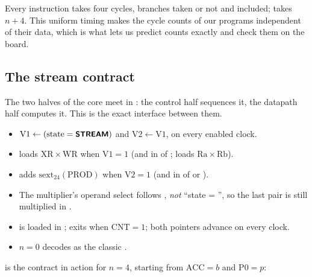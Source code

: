 Every instruction takes four cycles, branches taken or not and  included;  takes $n+4$. This uniform timing makes the cycle counts of our programs independent of their data, which is what lets us predict counts exactly and check them on the board.

\subsection{The stream contract}

The two halves of the core meet in : the control half sequences it, the datapath half computes it. This is the exact interface between them.

\begin{contract}
\begin{itemize}
\item $\mathrm{V1} \gets (\mathrm{state} = \text{\textsf{\bfseries\small STREAM}})$ and $\mathrm{V2} \gets \mathrm{V1}$, on every enabled clock.
\item {} loads $\mathrm{XR} \times \mathrm{WR}$ when $\mathrm{V1} = 1$ (and in  of ;  loads $\mathrm{Ra} \times \mathrm{Rb}$).
\item {} adds $\mathrm{sext}_{24}(\mathrm{PROD})$ when $\mathrm{V2} = 1$ (and in  of  or ).
\item The multiplier's operand select follows , \emph{not} ``state = '', so the last pair is still multiplied in .
\item {} is loaded in ;  exits when $\mathrm{CNT} = 1$; both pointers advance on every  clock.
\item $n = 0$ decodes as the classic .
\end{itemize}
\end{contract}


 is the contract in action for $n=4$, starting from $\mathrm{ACC} = b$ and $\mathrm{P0} = p$:

